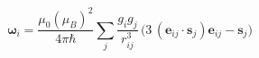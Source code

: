 \documentclass[preview]{standalone}
\begin{document}
\begin{varwidth}{50in}
  \begin{equation}
    \bm{\omega}_i = 
    \frac{\mu_0 (\mu_B)^2}{4\pi\hbar}\sum_{j}
    \frac{g_i g_j}{r_{ij}^3}
    \, \Big(
    3\,(\bm{e}_{ij}\cdot\bm{s}_{j})\bm{e}_{ij}
    -\bm{s}_{j} \Big) \nonumber
  \end{equation}
\end{varwidth}
\end{document}
